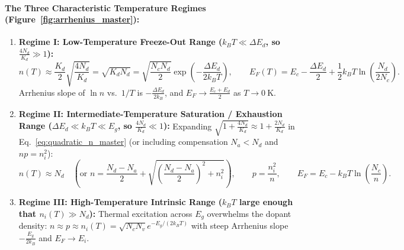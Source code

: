 \documentclass[11pt,a4paper]{article}
\begin{document}
\paragraph{The Three Characteristic Temperature Regimes (Figure~\ref{fig:arrhenius_master}):}
\begin{enumerate}
    \item \textbf{Regime I: Low-Temperature Freeze-Out Range ($k_B T \ll \Delta E_d$, so $\frac{4N_d}{K_d} \gg 1$):}
    \begin{equation}
        n(T) \approx \frac{K_d}{2}\sqrt{\frac{4N_d}{K_d}} = \sqrt{K_d N_d} = \boxed{\sqrt{\frac{N_c N_d}{2}}\exp\left(-\frac{\Delta E_d}{2k_B T}\right), \qquad E_F(T) = E_c - \frac{\Delta E_d}{2} + \frac{1}{2}k_B T\ln\left(\frac{N_d}{2N_c}\right).}
    \end{equation}
    Arrhenius slope of $\ln n$ vs.\ $1/T$ is $-\frac{\Delta E_d}{2k_B}$, and $E_F \to \frac{E_c + E_d}{2}$ as $T \to 0\ \mathrm{K}$.
    \item \textbf{Regime II: Intermediate-Temperature Saturation / Exhaustion Range ($\Delta E_d \ll k_B T \ll E_g$, so $\frac{4N_d}{K_d} \ll 1$):}
    Expanding $\sqrt{1 + \frac{4N_d}{K_d}} \approx 1 + \frac{2N_d}{K_d}$ in Eq.~\eqref{eq:quadratic_n_master} (or including compensation $N_a < N_d$ and $np = n_i^2$):
    \begin{equation}
        \boxed{n(T) \approx N_d \quad (\text{or } n = \frac{N_d - N_a}{2} + \sqrt{\left(\frac{N_d - N_a}{2}\right)^2 + n_i^2}), \qquad p = \frac{n_i^2}{n}, \qquad E_F = E_c - k_B T\ln\left(\frac{N_c}{n}\right).}
    \end{equation}
    \item \textbf{Regime III: High-Temperature Intrinsic Range ($k_B T$ large enough that $n_i(T) \gg N_d$):}
    Thermal excitation across $E_g$ overwhelms the dopant density: $n \approx p \approx n_i(T) = \sqrt{N_c N_v}e^{-E_g/(2k_B T)}$ with steep Arrhenius slope $-\frac{E_g}{2k_B}$ and $E_F \to E_i$.
\end{enumerate}
\end{document}
